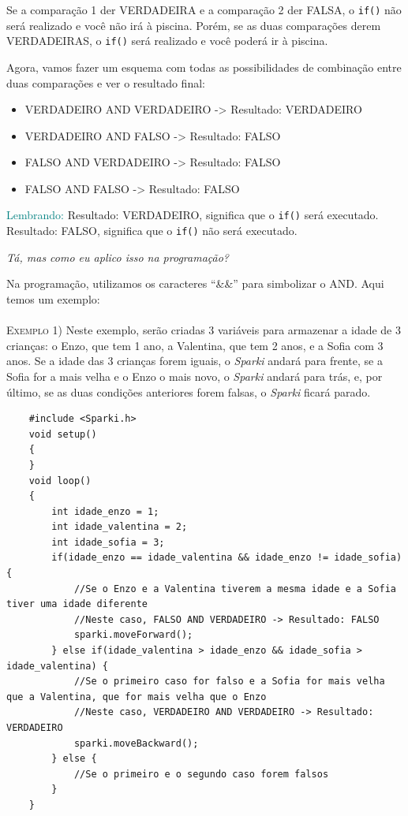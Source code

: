     Se a comparação 1 der VERDADEIRA e a comparação 2 der FALSA, o \texttt{if()} não será realizado e você não irá à piscina. Porém, se as duas comparações derem VERDADEIRAS, o \texttt{if()} será realizado e você poderá ir à piscina.
    
    Agora, vamos fazer um esquema com todas as possibilidades de combinação entre duas comparações e ver o resultado final:
    
    \begin{itemize}
        \item VERDADEIRO AND VERDADEIRO -> Resultado: VERDADEIRO
        \item VERDADEIRO AND FALSO -> Resultado: FALSO
        \item FALSO AND VERDADEIRO -> Resultado: FALSO
        \item FALSO AND FALSO -> Resultado: FALSO
    \end{itemize}
    
    \begin{center}
    \textcolor{teal}{Lembrando:}
    Resultado: VERDADEIRO, significa que o \texttt{if()} será executado. 
    Resultado: FALSO, significa que o \texttt{if()} não será executado.
    \end{center}
 
    \textit{Tá, mas como eu aplico isso na programação?}
        
    Na programação, utilizamos os caracteres ``\&\&'' para simbolizar o AND. Aqui temos um exemplo:
    \\
    \\
    \textsc{Exemplo 1)} Neste exemplo, serão criadas 3 variáveis para armazenar a idade de 3 crianças: o Enzo, que tem 1 ano, a Valentina, que tem 2 anos, e a Sofia com 3 anos. Se a idade das 3 crianças forem iguais, o \textsl{Sparki} andará para frente, se a Sofia for a mais velha e o Enzo o mais novo, o \textsl{Sparki} andará para trás, e, por último, se as duas condições anteriores forem falsas, o \textsl{Sparki} ficará parado.

    \begin{verbatim}
    #include <Sparki.h>
    void setup()
    {
    }
    void loop()
    {
        int idade_enzo = 1;
        int idade_valentina = 2;
        int idade_sofia = 3;
        if(idade_enzo == idade_valentina && idade_enzo != idade_sofia){
            //Se o Enzo e a Valentina tiverem a mesma idade e a Sofia tiver uma idade diferente
            //Neste caso, FALSO AND VERDADEIRO -> Resultado: FALSO
            sparki.moveForward();
        } else if(idade_valentina > idade_enzo && idade_sofia > idade_valentina) {
            //Se o primeiro caso for falso e a Sofia for mais velha que a Valentina, que for mais velha que o Enzo
            //Neste caso, VERDADEIRO AND VERDADEIRO -> Resultado: VERDADEIRO
            sparki.moveBackward();
        } else {
            //Se o primeiro e o segundo caso forem falsos
        }
    }
    \end{verbatim}
    
